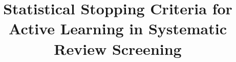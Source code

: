 \documentclass{bmcart}
\begin{document}
	
	\begin{frontmatter}
		
		\begin{fmbox}
			
			
			\title{Statistical Stopping Criteria for Active Learning in Systematic Review Screening}
			
			
			\author[
			addressref={aff1,aff2},                   %
			corref={aff1},                       %
			email={callaghan@mcc-berlin.net}   %
			]{ }
			\author[
			addressref={aff1},
			email={mueller-hansen@mcc-berlin.net}
			]{ }
			
			
			\address[id=aff1]{%
				, %
				,                     %
				,                              %
			}
			\address[id=aff2]{%
				,
				,
			}
			

\end{fmbox}
\end{frontmatter}
\end{document}

